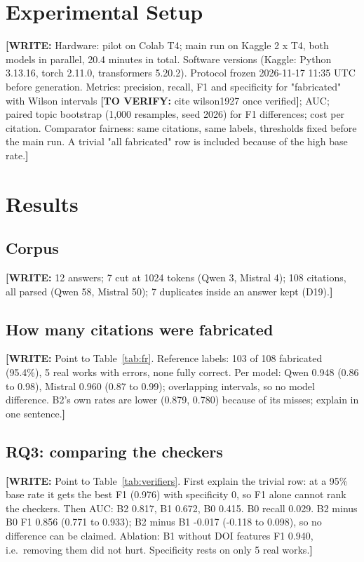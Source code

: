 \documentclass[10pt,twocolumn]{article}
\newcommand{\writeit}[1]{\textcolor{red!70!black}{\textbf{[WRITE:} #1\textbf{]}}}
\newcommand{\tv}[1]{\textcolor{orange!80!black}{\textbf{[TO VERIFY:} #1\textbf{]}}}
\begin{document}
\section{Experimental Setup}
\writeit{Hardware: pilot on Colab T4; main run on Kaggle 2 x T4, both models in parallel, 20.4 minutes in total. Software versions (Kaggle: Python 3.13.16, torch 2.11.0, transformers 5.20.2). Protocol frozen 2026-11-17 11:35 UTC before generation. Metrics: precision, recall, F1 and specificity for "fabricated" with Wilson intervals \tv{cite wilson1927 once verified}; AUC; paired topic bootstrap (1,000 resamples, seed 2026) for F1 differences; cost per citation. Comparator fairness: same citations, same labels, thresholds fixed before the main run. A trivial "all fabricated" row is included because of the high base rate.}

\section{Results}
\subsection{Corpus}
\writeit{12 answers; 7 cut at 1024 tokens (Qwen 3, Mistral 4); 108 citations, all parsed (Qwen 58, Mistral 50); 7 duplicates inside an answer kept (D19).}


\subsection{How many citations were fabricated}
\writeit{Point to Table~\ref{tab:fr}. Reference labels: 103 of 108 fabricated (95.4\%), 5 real works with errors, none fully correct. Per model: Qwen 0.948 (0.86 to 0.98), Mistral 0.960 (0.87 to 0.99); overlapping intervals, so no model difference. B2's own rates are lower (0.879, 0.780) because of its misses; explain in one sentence.}


\subsection{RQ3: comparing the checkers}
\writeit{Point to Table~\ref{tab:verifiers}. First explain the trivial row: at a 95\% base rate it gets the best F1 (0.976) with specificity 0, so F1 alone cannot rank the checkers. Then AUC: B2 0.817, B1 0.672, B0 0.415. B0 recall 0.029. B2 minus B0 F1 0.856 (0.771 to 0.933); B2 minus B1 -0.017 (-0.118 to 0.098), so no difference can be claimed. Ablation: B1 without DOI features F1 0.940, i.e.\ removing them did not hurt. Specificity rests on only 5 real works.}
\end{document}
